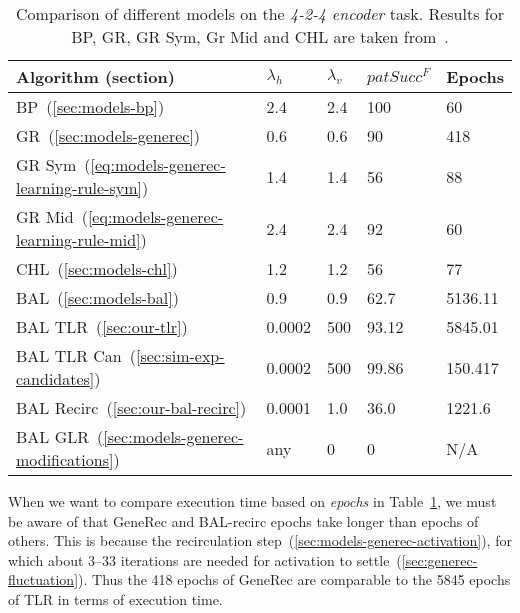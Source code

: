 \begin{table}[H] 
  \centering
    \begin{tabular}{|l|l|l|l|l|}
    \hline
    Algorithm (section)&$\lambda_h$&$\lambda_v$&$patSucc^F$ &Epochs\\ %
    \hline
    BP~(\ref{sec:models-bp}) &2.4 &2.4 &100&60\\ %
    \hline
    GR~(\ref{sec:models-generec}) &0.6 &0.6 &90&418\\ %
    \hline
    GR Sym~(\ref{eq:models-generec-learning-rule-sym}) &1.4 &1.4 &56&88\\ %
    \hline
    GR Mid~(\ref{eq:models-generec-learning-rule-mid}) &2.4 &2.4 &92&60\\ %
    \hline
    CHL~(\ref{sec:models-chl}) &1.2 &1.2 &56&77\\ %
    \hline
    BAL~(\ref{sec:models-bal})&0.9 &0.9 &62.7& 5136.11\\ %
    \hline
    BAL TLR~(\ref{sec:our-tlr})&0.0002  & 500&93.12&5845.01\\ %
    \hline
    BAL TLR Can~(\ref{sec:sim-exp-candidates})&0.0002&500&99.86&150.417\\ %
    \hline
    BAL Recirc~(\ref{sec:our-bal-recirc})&0.0001&1.0&36.0&1221.6\\ %
    \hline
    BAL GLR~(\ref{sec:models-generec-modifications})& any & 0 & 0 & N/A \\
    \hline 
    \end{tabular}
  \caption{Comparison of different models on the \emph{4-2-4 encoder} task. Results for BP, GR, GR Sym, Gr Mid and CHL are taken from~\citet{o1996bio}.} 
  \label{tab:results-cmp-auto4}
\end{table}

When we want to compare execution time based on \emph{epochs} in Table~\ref{tab:results-cmp-auto4}, we must be aware of that GeneRec and BAL-recirc epochs take longer than epochs of others. This is because the recirculation step~(\ref{sec:models-generec-activation}), for which about 3--33 iterations are needed for activation to settle~(\ref{sec:generec-fluctuation}). Thus the 418 epochs of GeneRec are comparable to the 5845 epochs of TLR in terms of execution time. 
